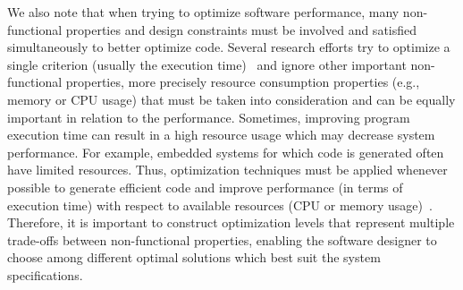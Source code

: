 We also note that when trying to optimize software performance, many non-functional properties and design constraints must be involved and satisfied simultaneously to better optimize code.
Several research efforts try to optimize a single criterion (usually the execution time)~\cite{ballal2015compiler,chen2012deconstructing,demertzi2011analyzing} and ignore other important non-functional properties, more precisely resource consumption properties (e.g., memory or CPU usage) that must be taken into consideration and can be equally important in relation to the performance. Sometimes, improving program execution time can result in a high resource usage which may decrease system performance. For example, embedded systems for which code is generated often have limited resources. Thus, optimization techniques must be applied whenever possible to generate efficient code and improve performance (in terms of execution time) with respect to available resources (CPU or memory usage)~\cite{nagiub2013automatic}.
Therefore, it is important to construct optimization levels that represent multiple trade-offs between non-functional properties, enabling the software designer to choose among different optimal solutions which best suit the system specifications.


